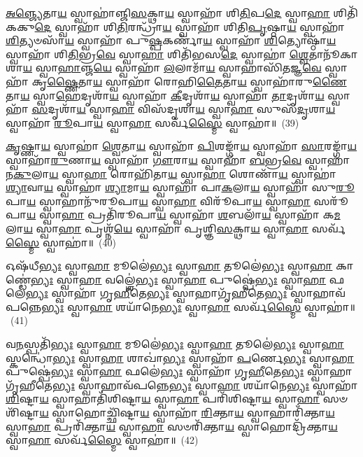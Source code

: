 {\anuvakamend[{\-\ul{𑌪𑌾}\-𑌰𑍍𑌶𑍍𑌵𑌾\-\ul{𑌭𑍍𑌯𑌾}\-\-\ul{𑍟} 𑌸𑍍𑌵𑌾𑌹𑌾᳴ \ul{𑌮}\-𑌜𑍍𑌜\-\ul{𑌭𑍍𑌯𑌃} 𑌸𑍍𑌵𑌾\-\ul{𑌹𑌾} 𑌷𑌟𑍍𑌚᳴}]}%

\-\ul{𑌅}\-\-\ul{𑌞𑍍𑌜𑍍𑌯𑍇}\-𑌤𑌾\-\ul{𑌯} 𑌸𑍍𑌵𑌾𑌹𑌾॑𑌞𑍍𑌜𑌿\-\ul{𑌸}\-𑌕𑍍𑌥𑌾\-\ul{𑌯} 𑌸𑍍𑌵𑌾𑌹𑌾᳴ 𑌶𑌿\-\ul{𑌤𑌿}\-𑌪\-\ul{𑌦𑍇} 𑌸𑍍𑌵𑌾\-\ul{𑌹𑌾} 𑌶𑌿𑌤𑌿᳴𑌕𑌕𑍁\-\ul{𑌦𑍇} 𑌸𑍍𑌵𑌾𑌹𑌾᳴ 𑌶𑌿\-\ul{𑌤𑌿}\-𑌰𑌨𑍍𑌧𑍍𑌰𑌾᳴\-\ul{𑌯} 𑌸𑍍𑌵𑌾𑌹𑌾᳴ 𑌶𑌿𑌤𑌿\-\ul{𑌪𑍃}\-𑌷𑍍𑌠𑌾\-\ul{𑌯} 𑌸𑍍𑌵𑌾𑌹𑌾᳴ \ul{𑌶𑌿}\-𑌤𑍍𑌯𑍞𑌸𑌾᳴\-\ul{𑌯} 𑌸𑍍𑌵𑌾𑌹𑌾᳴ 𑌪𑍁\-\ul{𑌷𑍍𑌪}\-𑌕𑌰𑍍𑌣𑌾᳴\-\ul{𑌯} 𑌸𑍍𑌵𑌾𑌹𑌾᳴ \ul{𑌶𑌿}\-𑌤𑍍𑌯𑍋𑌷𑍍𑌠𑌾᳴\-\ul{𑌯} 𑌸𑍍𑌵𑌾𑌹𑌾᳴ 𑌶𑌿\-\ul{𑌤𑌿}\-𑌭𑍍𑌰\-\ul{𑌵𑍇} 𑌸𑍍𑌵𑌾\-\ul{𑌹𑌾} 𑌶𑌿𑌤𑌿᳴𑌭𑌸\-\ul{𑌦𑍇} 𑌸𑍍𑌵𑌾𑌹𑌾॑ \ul{𑌶𑍍𑌵𑍇}\-𑌤𑌾𑌨𑍂᳴𑌕𑌾𑌶𑌾\-\ul{𑌯} 𑌸𑍍𑌵𑌾\-\ul{𑌹𑌾}\-𑌞𑍍𑌜\-\ul{𑌯𑍇} 𑌸𑍍𑌵𑌾𑌹𑌾᳴ \ul{𑌲}\-𑌲𑌾𑌮𑌾᳴\-\ul{𑌯} 𑌸𑍍𑌵𑌾𑌹𑌾𑌸𑌿᳴𑌤𑌜𑍍𑌞\-\ul{𑌵𑍇} 𑌸𑍍𑌵𑌾𑌹𑌾᳴ 𑌕𑍃\-\ul{𑌷𑍍𑌣𑍈}\-𑌤𑌾\-\ul{𑌯} 𑌸𑍍𑌵𑌾𑌹𑌾᳴ 𑌰𑍋𑌹𑌿\-\ul{𑌤𑍈}\-𑌤𑌾\-\ul{𑌯} 𑌸𑍍𑌵𑌾𑌹𑌾᳴𑌰𑍁\-\ul{𑌣𑍈}\-𑌤𑌾\-\ul{𑌯} 𑌸𑍍𑌵𑌾\-\ul{𑌹𑍇}\-𑌦𑍃𑌶𑌾᳴\-\ul{𑌯} 𑌸𑍍𑌵𑌾𑌹𑌾᳴ \ul{𑌕𑍀}\-𑌦𑍃𑌶𑌾᳴\-\ul{𑌯} 𑌸𑍍𑌵𑌾𑌹𑌾᳴ \ul{𑌤𑌾}\-𑌦𑍃𑌶𑌾᳴\-\ul{𑌯} 𑌸𑍍𑌵𑌾𑌹𑌾᳴ \ul{𑌸}\-𑌦𑍃𑌶𑌾᳴\-\ul{𑌯} 𑌸𑍍𑌵𑌾\-\ul{𑌹𑌾} 𑌵𑌿𑌸᳴𑌦𑍃𑌶𑌾\-\ul{𑌯} 𑌸𑍍𑌵𑌾\-\ul{𑌹𑌾} 𑌸𑍁𑌸᳴\-\ul{𑌦𑍃}\-𑌶𑌾\-\ul{𑌯} 𑌸𑍍𑌵𑌾𑌹𑌾᳴ \ul{𑌰𑍂}\-𑌪𑌾\-\ul{𑌯} 𑌸𑍍𑌵𑌾\-\ul{𑌹𑌾} 𑌸𑌰𑍍𑌵᳴\-\ul{𑌸𑍍𑌮𑍈} 𑌸𑍍𑌵𑌾𑌹𑌾॑॥~(39)

{\anuvakamend[{\-\ul{𑌰𑍂}\-𑌪𑌾\-\ul{𑌯} 𑌸𑍍𑌵𑌾\-\ul{𑌹𑌾} 𑌦𑍍𑌵𑍇 𑌚᳴}]}%

\-\ul{𑌕𑍃}\-𑌷𑍍𑌣𑌾\-\ul{𑌯} 𑌸𑍍𑌵𑌾𑌹𑌾॑ \ul{𑌶𑍍𑌵𑍇}\-𑌤𑌾\-\ul{𑌯} 𑌸𑍍𑌵𑌾𑌹𑌾᳴ \ul{𑌪𑌿}\-𑌶𑌙𑍍𑌗𑌾᳴\-\ul{𑌯} 𑌸𑍍𑌵𑌾𑌹𑌾᳴ \ul{𑌸𑌾}\-𑌰𑌙𑍍𑌗𑌾᳴\-\ul{𑌯} 𑌸𑍍𑌵𑌾𑌹𑌾᳴\-\ul{𑌰𑍁}\-𑌣𑌾\-\ul{𑌯} 𑌸𑍍𑌵𑌾𑌹𑌾᳴ \ul{𑌗𑍗}\-𑌰𑌾\-\ul{𑌯} 𑌸𑍍𑌵𑌾𑌹𑌾᳴ \ul{𑌬}\-𑌭𑍍𑌰\-\ul{𑌵𑍇} 𑌸𑍍𑌵𑌾𑌹𑌾᳴ 𑌨\-\ul{𑌕𑍁}\-𑌲𑌾\-\ul{𑌯} 𑌸𑍍𑌵𑌾\-\ul{𑌹𑌾} 𑌰𑍋𑌹𑌿᳴𑌤𑌾\-\ul{𑌯} 𑌸𑍍𑌵𑌾\-\ul{𑌹𑌾} 𑌶𑍋𑌣𑌾᳴\-\ul{𑌯} 𑌸𑍍𑌵𑌾𑌹𑌾॑ \ul{𑌶𑍍𑌯𑌾}\-𑌵𑌾\-\ul{𑌯} 𑌸𑍍𑌵𑌾𑌹𑌾॑ \ul{𑌶𑍍𑌯𑌾}\-𑌮𑌾\-\ul{𑌯} 𑌸𑍍𑌵𑌾𑌹𑌾᳴ 𑌪𑌾\-\ul{𑌕}\-𑌲𑌾\-\ul{𑌯} 𑌸𑍍𑌵𑌾𑌹𑌾᳴ 𑌸𑍁\-\ul{𑌰𑍂}\-𑌪𑌾\-\ul{𑌯} 𑌸𑍍𑌵𑌾𑌹𑌾𑌨𑍁᳴𑌰𑍂𑌪𑌾\-\ul{𑌯} 𑌸𑍍𑌵𑌾\-\ul{𑌹𑌾} 𑌵𑌿𑌰𑍂᳴𑌪𑌾\-\ul{𑌯} 𑌸𑍍𑌵𑌾\-\ul{𑌹𑌾} 𑌸𑌰𑍂᳴𑌪𑌾\-\ul{𑌯} 𑌸𑍍𑌵𑌾\-\ul{𑌹𑌾} 𑌪𑍍𑌰𑌤𑌿᳴𑌰𑍂𑌪𑌾\-\ul{𑌯} 𑌸𑍍𑌵𑌾𑌹𑌾᳴ \ul{𑌶}\-𑌬𑌲𑌾᳴\-\ul{𑌯} 𑌸𑍍𑌵𑌾𑌹𑌾᳴ 𑌕\-\ul{𑌮}\-𑌲𑌾\-\ul{𑌯} 𑌸𑍍𑌵𑌾\-\ul{𑌹𑌾} 𑌪𑍃𑌶𑍍𑌨᳴\-\ul{𑌯𑍇} 𑌸𑍍𑌵𑌾𑌹𑌾᳴ 𑌪𑍃𑌶𑍍𑌞𑌿\-\ul{𑌸}\-𑌕𑍍𑌥𑌾\-\ul{𑌯} 𑌸𑍍𑌵𑌾\-\ul{𑌹𑌾} 𑌸𑌰𑍍𑌵᳴\-\ul{𑌸𑍍𑌮𑍈} 𑌸𑍍𑌵𑌾𑌹𑌾॑॥~(40)

{\anuvakamend[{\-\ul{𑌕𑍃}\-𑌷𑍍𑌣𑌾\-\ul{𑌯} 𑌷𑌟𑍍𑌚᳴𑌤𑍍𑌵𑌾𑌰𑌿𑍞𑌶𑌤𑍍}]}%

𑌓𑌷᳴𑌧𑍀\-\ul{𑌭𑍍𑌯𑌃} 𑌸𑍍𑌵𑌾\-\ul{𑌹𑌾} 𑌮𑍂𑌲𑍇॑\-\ul{𑌭𑍍𑌯𑌃} 𑌸𑍍𑌵𑌾\-\ul{𑌹𑌾} 𑌤𑍂𑌲𑍇॑\-\ul{𑌭𑍍𑌯𑌃} 𑌸𑍍𑌵𑌾\-\ul{𑌹𑌾} 𑌕𑌾𑌣𑍍𑌡𑍇॑\-\ul{𑌭𑍍𑌯𑌃} 𑌸𑍍𑌵𑌾\-\ul{𑌹𑌾} 𑌵𑌲𑍍\mbox{}𑌶𑍇॑\-\ul{𑌭𑍍𑌯𑌃} 𑌸𑍍𑌵𑌾\-\ul{𑌹𑌾} 𑌪𑍁𑌷𑍍𑌪𑍇॑\-\ul{𑌭𑍍𑌯𑌃} 𑌸𑍍𑌵𑌾\-\ul{𑌹𑌾} 𑌫𑌲𑍇॑\-\ul{𑌭𑍍𑌯𑌃} 𑌸𑍍𑌵𑌾𑌹𑌾᳴ 𑌗𑍃\-\ul{𑌹𑍀}\-𑌤𑍇\-\ul{𑌭𑍍𑌯𑌃} 𑌸𑍍𑌵𑌾𑌹𑌾𑌗𑍃᳴𑌹𑍀𑌤𑍇\-\ul{𑌭𑍍𑌯𑌃} 𑌸𑍍𑌵𑌾𑌹𑌾𑌵᳴𑌪𑌨𑍍𑌨𑍇\-\ul{𑌭𑍍𑌯𑌃} 𑌸𑍍𑌵𑌾\-\ul{𑌹𑌾} 𑌶𑌯𑌾᳴𑌨𑍇\-\ul{𑌭𑍍𑌯𑌃} 𑌸𑍍𑌵𑌾\-\ul{𑌹𑌾} 𑌸𑌰𑍍𑌵᳴\-\ul{𑌸𑍍𑌮𑍈} 𑌸𑍍𑌵𑌾𑌹𑌾॑॥~(41)

{\anuvakamend[{𑌓𑌷᳴𑌧𑍀\-\ul{𑌭𑍍𑌯}\-𑌶𑍍𑌚𑌤𑍁᳴𑌰𑍍𑌵𑌿𑍞𑌶𑌤𑌿𑌃}]}%

𑌵\-\ul{𑌨}\-𑌸𑍍𑌪𑌤𑌿᳴\-\ul{𑌭𑍍𑌯𑌃} 𑌸𑍍𑌵𑌾\-\ul{𑌹𑌾} 𑌮𑍂𑌲𑍇॑\-\ul{𑌭𑍍𑌯𑌃} 𑌸𑍍𑌵𑌾\-\ul{𑌹𑌾} 𑌤𑍂𑌲𑍇॑\-\ul{𑌭𑍍𑌯𑌃} 𑌸𑍍𑌵𑌾\-\ul{𑌹𑌾} 𑌸𑍍𑌕𑌨𑍍𑌧𑍋॑\-\ul{𑌭𑍍𑌯𑌃} 𑌸𑍍𑌵𑌾\-\ul{𑌹𑌾} 𑌶𑌾𑌖𑌾॑\-\ul{𑌭𑍍𑌯𑌃} 𑌸𑍍𑌵𑌾𑌹𑌾᳴ \ul{𑌪}\-𑌰𑍍𑌣𑍇\-\ul{𑌭𑍍𑌯𑌃} 𑌸𑍍𑌵𑌾\-\ul{𑌹𑌾} 𑌪𑍁𑌷𑍍𑌪𑍇॑\-\ul{𑌭𑍍𑌯𑌃} 𑌸𑍍𑌵𑌾\-\ul{𑌹𑌾} 𑌫𑌲𑍇॑\-\ul{𑌭𑍍𑌯𑌃} 𑌸𑍍𑌵𑌾𑌹𑌾᳴ 𑌗𑍃\-\ul{𑌹𑍀}\-𑌤𑍇\-\ul{𑌭𑍍𑌯𑌃} 𑌸𑍍𑌵𑌾𑌹𑌾𑌗𑍃᳴𑌹𑍀𑌤𑍇\-\ul{𑌭𑍍𑌯𑌃} 𑌸𑍍𑌵𑌾𑌹𑌾𑌵᳴𑌪𑌨𑍍𑌨𑍇\-\ul{𑌭𑍍𑌯𑌃} 𑌸𑍍𑌵𑌾\-\ul{𑌹𑌾} 𑌶𑌯𑌾᳴𑌨𑍇\-\ul{𑌭𑍍𑌯𑌃} 𑌸𑍍𑌵𑌾𑌹𑌾᳴ \ul{𑌶𑌿}\-𑌷𑍍𑌟𑌾\-\ul{𑌯} 𑌸𑍍𑌵𑌾𑌹𑌾𑌤𑌿᳴𑌶𑌿𑌷𑍍𑌟𑌾\-\ul{𑌯} 𑌸𑍍𑌵𑌾\-\ul{𑌹𑌾} 𑌪𑌰𑌿᳴𑌶𑌿𑌷𑍍𑌟𑌾\-\ul{𑌯} 𑌸𑍍𑌵𑌾\-\ul{𑌹𑌾} 𑌸𑍞𑌶𑌿᳴𑌷𑍍𑌟𑌾\-\ul{𑌯} 𑌸𑍍𑌵𑌾𑌹𑍋𑌚𑍍𑌛𑌿᳴𑌷𑍍𑌟𑌾\-\ul{𑌯} 𑌸𑍍𑌵𑌾𑌹𑌾᳴ \ul{𑌰𑌿}\-𑌕𑍍𑌤𑌾\-\ul{𑌯} 𑌸𑍍𑌵𑌾𑌹𑌾𑌰𑌿᳴𑌕𑍍𑌤𑌾\-\ul{𑌯} 𑌸𑍍𑌵𑌾\-\ul{𑌹𑌾} 𑌪𑍍𑌰𑌰𑌿᳴𑌕𑍍𑌤𑌾\-\ul{𑌯} 𑌸𑍍𑌵𑌾\-\ul{𑌹𑌾} 𑌸𑍞𑌰𑌿᳴𑌕𑍍𑌤𑌾\-\ul{𑌯} 𑌸𑍍𑌵𑌾𑌹𑍋𑌦𑍍𑌰𑌿᳴𑌕𑍍𑌤𑌾\-\ul{𑌯} 𑌸𑍍𑌵𑌾\-\ul{𑌹𑌾} 𑌸𑌰𑍍𑌵᳴\-\ul{𑌸𑍍𑌮𑍈} 𑌸𑍍𑌵𑌾𑌹𑌾॑॥~(42)

